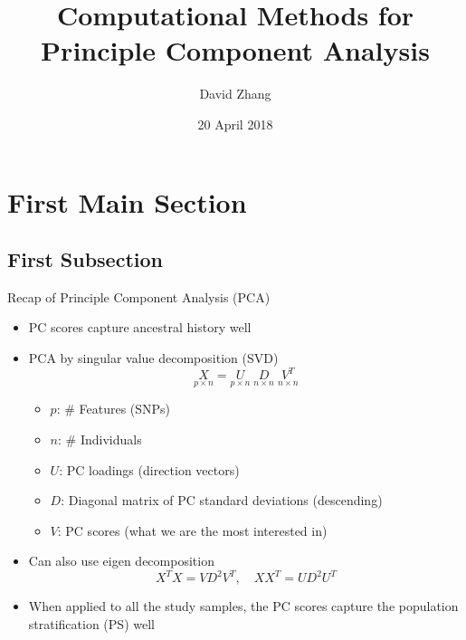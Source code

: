 \documentclass{beamer}
\title{Computational Methods for Principle Component Analysis}
\author{David Zhang}
\date{20 April 2018}
\begin{document}
\begin{frame}
  \titlepage
\end{frame}

\section{First Main Section}

\subsection{First Subsection}

\begin{frame}{Recap of Principle Component Analysis (PCA)}
\begin{itemize}
\item PC scores capture ancestral history well
\item PCA by singular value decomposition (SVD)
    \[
        \underset{p \times n}{X} = \underset{p \times n}{U} \; \underset{n \times n}{D} \; \underset{n \times n}{V^T}
    \]
    \begin{itemize}
        \item $p$: \# Features (SNPs)
        \item $n$: \# Individuals
        \item $U$: PC loadings (direction vectors)
        \item $D$: Diagonal matrix of PC standard deviations (descending)
        \item $V$: PC scores (what we are the most interested in)
    \end{itemize}
\item Can also use eigen decomposition
    \[
        X^T X = VD^2V^T, \quad X X^T = U D^2 U^T
    \]
\item When applied to all the study samples,
    the PC scores capture the population stratification (PS) well
\end{itemize}
\end{frame}
\end{document}
